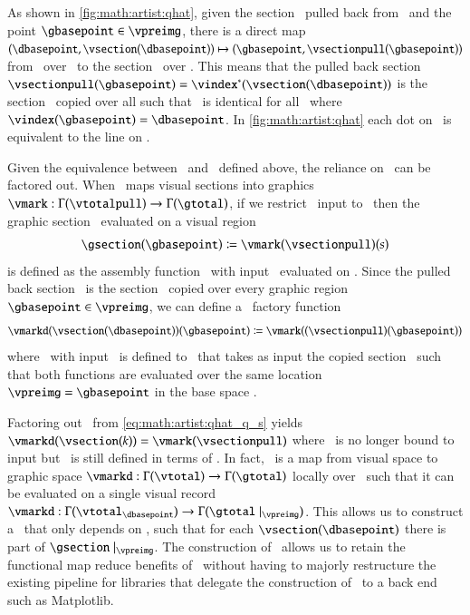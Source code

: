 \documentclass[journal]{vgtc}                %
\begin{document}
As shown in \autoref{fig:math:artist:qhat}, given the section \vsectionpull\ pulled back from \vsection\ and the point $\gbasepoint \in \vpreimg$, there is a direct map $(\dbasepoint, \vsection(\dbasepoint)) \mapsto (\gbasepoint, \vsectionpull(\gbasepoint))$  from \vsection\ over \dbasepoint\ to the section \vsectionpull\ over \gbasepoint. This means that the pulled back section $\vsectionpull(\gbasepoint) = \vindex^*(\vsection(\dbasepoint))$ is the section \vsection\ copied over all \gbasepoint such that \vsectionpull\ is identical for all \gbasepoint\ where $\vindex(\gbasepoint) = \dbasepoint$. In \autoref{fig:math:artist:qhat} each dot on \vfiber\ is equivalent to the line on \vfiberpull. 

Given the equivalence between \vsection\ and \vsectionpull\ defined above, the reliance on \gbase\ can be factored out. When \vmark\ maps visual sections into graphics $\vmark: \Gamma(\vtotalpull) \rightarrow \Gamma(\gtotal)$, if we restrict \vmark\ input to \vsectionpull\ then the graphic section \gsection\ evaluated on a visual region \gbasepoint\
\begin{equation}
    \gsection(\gbasepoint) \coloneqq \vmark(\vsectionpull)(s)
    \label{eq:math:artist:qhat}
\end{equation}
 is defined as the assembly function \vmark\ with input \vsectionpull\ evaluated on \gbasepoint. Since the pulled back section \vsectionpull\ is the section \vsection\ copied over every graphic region $\gbasepoint \in \vpreimg$, we can define a \vmark\ factory function 
\begin{equation}
\label{eq:math:artist:qhat_q_s}
\vmarkd(\vsection(\dbasepoint))(\gbasepoint) \coloneqq \vmark((\vsectionpull)(\gbasepoint))
\end{equation} 
where \vmarkd\ with input \vsection\ is defined to \vmark\ that takes as input the copied section \vsectionpull\ such that both functions are evaluated over the same location $\vpreimg = \gbasepoint$ in the base space \gbase. 

Factoring out \gbasepoint\ from \autoref{eq:math:artist:qhat_q_s} yields $\vmarkd(\vsection(k)) = \vmark(\vsectionpull)$ where \vmark\ is no longer bound to input but \vmarkd\ is still defined in terms of \dbase. In fact, \vmarkd\ is a map from visual space to graphic space $\vmarkd:\Gamma(\vtotal) \rightarrow \Gamma(\gtotal)$ locally over \dbasepoint\ such that it can be evaluated on a single visual record  $\vmarkd:\Gamma(\vtotal_{\dbasepoint}) \rightarrow \Gamma(\gtotal\mid_{\vpreimg})$. This allows us to construct a \vmarkd\ that only depends on \dbase, such that for each $\vsection(\dbasepoint)$ there is part of $\gsection\mid_{\vpreimg}$. The construction of \vmarkd\ allows us to retain the functional map reduce benefits of \vmark\ without having to majorly restructure the existing pipeline for libraries that delegate the construction of \gsection\ to a back end such as Matplotlib.
\end{document}
